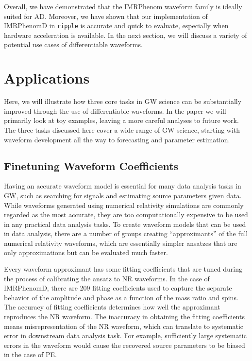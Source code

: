 \documentclass[twocolumn]{aastex631}
\newcommand{\ripple}{\texttt{ripple}\xspace}
\begin{document}
Overall, we have demonstrated that the IMRPhenom waveform family is ideally suited for AD.
Moreover, we have shown that our implementation of IMRPhenomD in \ripple is accurate and quick to evaluate, especially when hardware acceleration is available.
In the next section, we will discuss a variety of potential use cases of differentiable waveforms.


\section{Applications}
\label{sec:applications}

Here, we will illustrate how three core tasks in GW science can be substantially improved through the use of differentiable waveforms.
In the paper we will primarily look at toy examples, leaving a more careful analyses to future work. 
The three tasks discussed here cover a wide range of GW science, starting with waveform development all the way to forecasting and parameter estimation.

\subsection{Finetuning Waveform Coefficients}
\label{subsec:coeffs}

Having an accurate waveform model is essential for many data analysis tasks in
GW, such as searching for signals and estimating source parameters given data.
While waveforms generated using numerical relativity simulations are commonly
regarded as the most accurate, they are too computationally expensive to be used
in any practical data analysis tasks. To create waveform models that can be used
in data analysis, there are a number of groups creating ``approximants'' of the
full numerical relativity waveforms, which are essentially simpler ansatzes that
are only approximations but can be evaluated much faster. 

Every waveform approximant has some fitting coefficients that are tuned during
the process of calibrating the ansatz to NR waveforms. In the case of
IMRPhenomD, there are 209 fitting coefficients used to capture the separate
behavior of the amplitude and phase as a function of the mass ratio and spins.
The accuracy of fitting coefficients determines how well the approximant
reproduces the NR waveform. The inaccuracy in obtaining the fitting coefficients
means misrepresentation of the NR waveform, which can translate to systematic
error in downstream data analysis task. For example, sufficiently large
systematic errors in the waveform would cause the recovered source parameters to be biased
in the case of PE.
\end{document}

